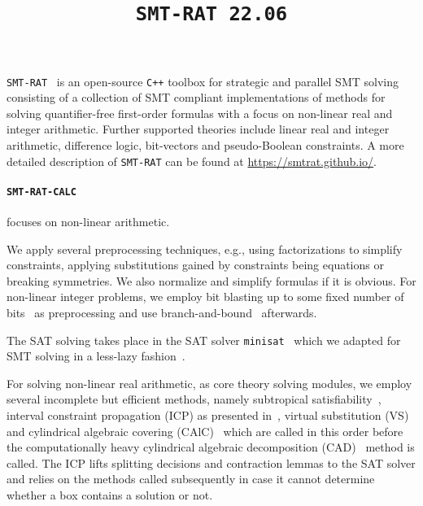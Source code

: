 \documentclass{article}
\title{\texttt{SMT-RAT 22.06}}
\begin{document}
\maketitle

\texttt{SMT-RAT}~\cite{Corzilius2015} is an open-source \texttt{C++} toolbox for strategic and parallel SMT solving consisting of a collection of SMT compliant implementations of methods for
solving quantifier-free first-order formulas with a focus on non-linear real and integer arithmetic.
Further supported theories include linear real and integer arithmetic, difference logic, bit-vectors and pseudo-Boolean constraints.
A more detailed description of \texttt{SMT-RAT} can be found at \href{https://smtrat.github.io/}{\color{blue}https://smtrat.github.io/}.


\iffalse
\paragraph{\texttt{SMT-RAT-CALC}} focuses on non-linear arithmetic.

We apply several preprocessing techniques, e.g., using factorizations to simplify constraints, applying substitutions gained by constraints being equations or breaking symmetries. We also normalize and simplify formulas if it is obvious. For non-linear integer problems, we employ bit blasting up to some fixed number of bits~\cite{kruger2015bitvectors} as preprocessing and use branch-and-bound~\cite{Kremer2016} afterwards.

The SAT solving takes place in the SAT solver \texttt{minisat}~\cite{Een2003} which we adapted for SMT solving in a less-lazy fashion~\cite{sebastiani2007lazy}.

For solving non-linear real arithmetic, as core theory solving modules, we employ several incomplete but efficient methods, namely subtropical satisfiability~\cite{Fontaine2017}, interval constraint propagation (ICP) as presented in~\cite{GGIGSC10}, virtual substitution (VS)~\cite{Article_Corzilius_FCT2011} and cylindrical algebraic covering (CAlC)~\cite{Abraham2020} which are called in this order before the computationally heavy cylindrical algebraic decomposition (CAD)~\cite{Loup2013} method is called. The ICP lifts splitting decisions and contraction lemmas to the SAT solver and relies on the methods called subsequently in case it cannot determine whether a box contains a solution or not. 
\end{document}
